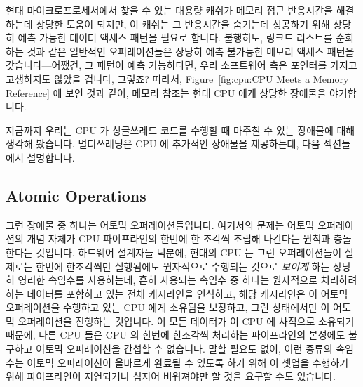 현대 마이크로프로세서에서 찾을 수 있는 대용량 캐쉬가 메모리 접근 반응시간을
해결하는데 상당한 도움이 되지만, 이 캐쉬는 그 반응시간을 숨기는데 성공하기 위해
상당히 예측 가능한 데이터 액세스 패턴을 필요로 합니다.
불행히도, 링크드 리스트를 순회하는 것과 같은 일반적인 오퍼레이션들은 상당히
예측 불가능한 메모리 액세스 패턴을 갖습니다---어쨌건, 그 패턴이 예측
가능하다면, 우리 소프트웨어 측은 포인터를 가지고 고생하지도 않았을 겁니다,
그렇죠?
따라서,
Figure~\ref{fig:cpu:CPU Meets a Memory Reference} 에 보인 것과 같이, 메모리
참조는 현대 CPU 에게 상당한 장애물을 야기합니다.

지금까지 우리는 CPU 가 싱글쓰레드 코드를 수행할 때 마주칠 수 있는 장애물에 대해
생각해 봤습니다.
멀티쓰레딩은 CPU 에 추가적인 장애물을 제공하는데, 다음 섹션들에서 설명합니다.

\subsection{Atomic Operations}
\label{sec:cpu:Atomic Operations}

그런 장애물 중 하나는 어토믹 오퍼레이션들입니다.
여기서의 문제는 어토믹 오퍼레이션의 개념 자체가 CPU 파이프라인의 한번에 한
조각씩 조립해 나간다는 원칙과 충돌한다는 것입니다.
하드웨어 설계자들 덕분에, 현대의 CPU 는 그런 오퍼레이션들이 실제로는 한번에
한조각씩만 실행됨에도 원자적으로 수행되는 것으로 \emph{보이게} 하는 상당히
영리한 속임수를 사용하는데, 흔히 사용되는 속임수 중 하나는 원자적으로 처리하려
하는 데이터를 포함하고 있는 전체 캐시라인을 인식하고, 해당 캐시라인은 이 어토믹
오퍼레이션을 수행하고 있는 CPU 에게 소유됨을 보장하고, 그런 상태에서만 이
어토믹 오퍼레이션을 진행하는 것입니다.
이 모든 데이터가 이 CPU 에 사적으로 소유되기 때문에, 다른 CPU 들은 CPU 의
한번에 한조각씩 처리하는 파이프라인의 본성에도 불구하고 어토믹 오퍼레이션을
간섭할 수 없습니다.
말할 필요도 없이, 이런 종류의 속임수는 어토믹 오퍼레이션이 올바르게 완료될 수
있도록 하기 위해 이 셋업을 수행하기 위해 파이프라인이 지연되거나 심지어
비워져야만 할 것을 요구할 수도 있습니다.

